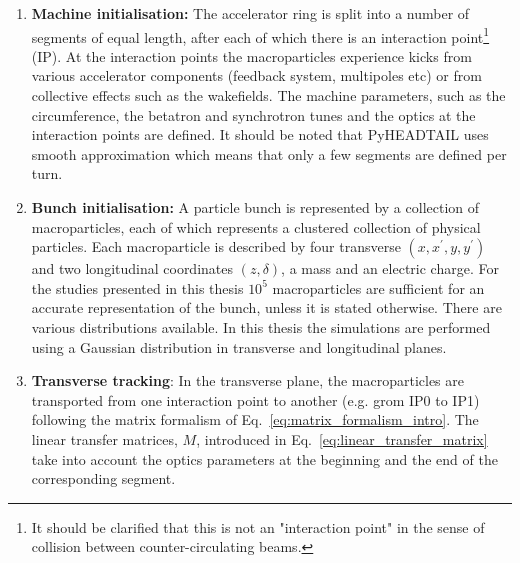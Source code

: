 {\begin{enumerate}
    \item \textbf{Machine initialisation:} The accelerator ring is split into a number of segments of equal length, after each of which there is an interaction point\footnote{It should be clarified that this is not an "interaction point" in the sense of collision between counter-circulating beams.} (IP). At the interaction points the macroparticles experience kicks from various accelerator components (feedback system, multipoles etc) or from collective effects such as the wakefields. The machine parameters, such as the circumference, the betatron and synchrotron tunes and the optics at the interaction points are defined. It should be noted that PyHEADTAIL uses smooth \mbox{approximation} which means that only a few segments are defined per turn. %
    \item \textbf{Bunch initialisation:}  A particle bunch is represented by a collection of macroparticles, each of which represents a clustered collection of physical particles. Each macroparticle is described by four transverse $(x, x^\prime, y, y^\prime)$ and two longitudinal coordinates $(z, \delta)$, a mass and an electric charge. For the studies presented in this thesis $10^{5}$ macroparticles are sufficient for an accurate representation of the bunch, unless it is stated otherwise. There are various distributions available. In this thesis the simulations are performed using a Gaussian distribution in transverse and longitudinal planes.
    \item \textbf{Transverse tracking}: In the transverse plane, the macroparticles are transported from one interaction point to another 
    (e.g. grom IP0 to IP1) following the matrix formalism of Eq.~\eqref{eq:matrix_formalism_intro}. The linear transfer matrices, $M$, introduced in Eq.~\eqref{eq:linear_transfer_matrix} take into account the optics parameters at the beginning and the end of the corresponding segment.

\end{enumerate}}
